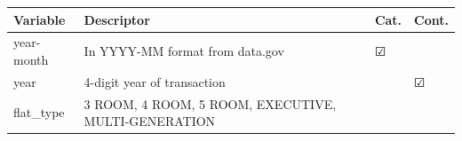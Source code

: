 \documentclass[]{book}
\begin{document}
\begin{longtable}[]{@{}llll@{}}
\toprule
\begin{minipage}[b]{0.09\columnwidth}\raggedright\strut
Variable\strut
\end{minipage} & \begin{minipage}[b]{0.70\columnwidth}\raggedright\strut
Descriptor\strut
\end{minipage} & \begin{minipage}[b]{0.04\columnwidth}\raggedright\strut
Cat.\strut
\end{minipage} & \begin{minipage}[b]{0.05\columnwidth}\raggedright\strut
Cont.\strut
\end{minipage}\tabularnewline
\midrule
\endhead
\begin{minipage}[t]{0.09\columnwidth}\raggedright\strut
year-month\strut
\end{minipage} & \begin{minipage}[t]{0.70\columnwidth}\raggedright\strut
In YYYY-MM format from data.gov\strut
\end{minipage} & \begin{minipage}[t]{0.04\columnwidth}\raggedright\strut
☑\strut
\end{minipage} & \begin{minipage}[t]{0.05\columnwidth}\raggedright\strut
\strut
\end{minipage}\tabularnewline
\begin{minipage}[t]{0.09\columnwidth}\raggedright\strut
year\strut
\end{minipage} & \begin{minipage}[t]{0.70\columnwidth}\raggedright\strut
4-digit year of transaction\strut
\end{minipage} & \begin{minipage}[t]{0.04\columnwidth}\raggedright\strut
\strut
\end{minipage} & \begin{minipage}[t]{0.05\columnwidth}\raggedright\strut
☑\strut
\end{minipage}\tabularnewline
\begin{minipage}[t]{0.09\columnwidth}\raggedright\strut
flat\_type\strut
\end{minipage} & \begin{minipage}[t]{0.70\columnwidth}\raggedright\strut
3 ROOM, 4 ROOM, 5 ROOM, EXECUTIVE, MULTI-GENERATION\strut
\end{minipage} & \begin{minipage}[t]{0.04\columnwidth}\raggedright\strut

\end{minipage}
\end{longtable}
\end{document}
